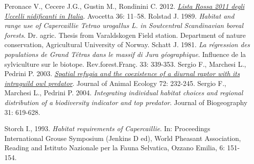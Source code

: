 \documentclass[10pt,twoside,openany,x11names,svgnames,italian,a5paper,dvipsnames,table]{memoir}
\begin{document}
\begin{thebibliography}{9}
Peronace V., Cecere J.G., Gustin M., Rondinini C. 2012. \href{http://ciso-coi.it/wp-content/uploads/2012/10/redlist-2011.pdf}{\emph{Lista Rossa 2011 degli Uccelli nidificanti in Italia}}. Avocetta 36: 11–58.
Rolstad J. 1989. \emph{Habitat and range use of Capercaillie \emph{Tetrao urogallus} L. in Soutcentral Scandinavian boreal forests}. Dr. agric. Thesis from Varaldskogen Field station. Department of nature conservation, Agricultural University of Norway.
Schatt J. 1981. \emph{La régression des populations de Grand Tétras dans le massif di Jura géographique}. Influence de la sylviculture sur le biotope. Rev.forest.Franç. 33: 339-353.
Sergio F., Marchesi L., Pedrini P. 2003. \href{http://onlinelibrary.wiley.com/doi/10.1046/j.1365-2656.2003.00693.x/pdf}{\emph{Spatial refugia and the coexistence of a diurnal raptor with its intraguild owl predator}}. Journal of Animal Ecology 72: 232-245.
Sergio F., Marchesi L., Pedrini P. 2004. \emph{Integrating individual habitat choices and regional distribution of a biodiversity indicator and top predator}. Journal of Biogeography 31: 619-628.

Storch I., 1993. \emph{Habitat requirements of Capercaillie}. In: Proceedings International Grouse Symposium (Jenkins D ed), World Pheasant Association, Reading and Istituto Nazionale per la Fauna Selvatica, Ozzano Emilia, 6: 151-154.


\end{thebibliography}
\end{document}
